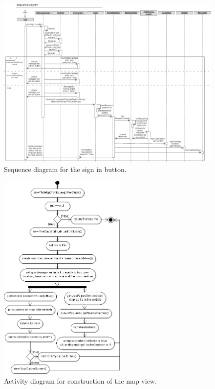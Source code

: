 \begin{landscape}
\begin{figure}
    \centering
    \includegraphics[height=0.9\textwidth]{images/sequence/signInbutton}
    \caption{Sequence diagram for the sign in button.}
    \label{fig:signIn}
\end{figure}
\end{landscape}

\begin{figure}
    \includegraphics[width=0.56\textwidth]{images/activity/newMap}
    \caption{Activity diagram for construction of the map view.}
\end{figure}

